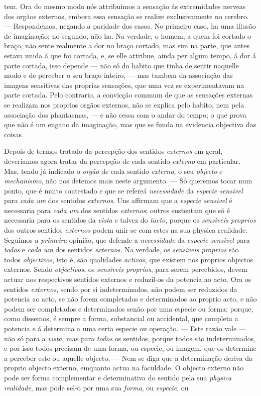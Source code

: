 tem. Ora do mesmo modo nós attribuimos a sensação ás extremidades nerveas dos orgãos externos, embora essa sensação se realize exclusivamente no cerebro. --- Respondemos, negando a paridade dos casos. No primeiro caso, ha uma illusão de imaginação; no segundo, não ha. Na verdade, o homem, a quem foi cortado o braço, não sente realmente a dor no braço cortado, mas sim na parte, que antes estava unida á que foi cortada, e, se elle attribue, ainda per algum tempo, á dor á parte cortada, isso depende --- não só do habito que tinha de sentir naquelle modo e de perceber o seu braço inteiro, --- mas tambem da associação das imagens sensitivas das proprias sensações, que uma vez se experimentavam na parte cortada. Pelo contrario, a convicção commum de que as sensações externas se realizam nos proprios orgãos externos, não se explica pelo habito, nem pela associação dos phantasmas, --- e não cessa com o andar do tempo; o que prova que não é um engano da imaginação, mas que se funda na evidencia objectiva das coisas.\par *\par Depois de termos tratado da percepção dos sentidos \emph{externos} em geral, deveriamos agora tratar da percepção de cada sentido \emph{externo} em particular. Mas, tendo já indicado o \emph{orgão} de cada sentido \emph{externo}, o seu \emph{objecto} e \emph{mechanismo}, não nos detemos mais neste argumento. --- Só queremos tocar num ponto, que é muito contestado e que se refereá \emph{necessidade} da \emph{especie sensivel} para \emph{cada um} dos sentidos \emph{externos}. Uns affirmam que a \emph{especie sensivel} é necessaria para \emph{cada um} dos sentidos \emph{externos}; outros sustentam que só é necessaria para os sentidos da \emph{vista} e talvez do \emph{tacto}, porque os \emph{sensiveis proprios} dos outros sentidos \emph{externos} podem unir-se com estes na sua physica realidade. Seguimos a \emph{primeira} opinião, que defende a \emph{necessidade} da \emph{especie sensivel} para \emph{todos} e \emph{cada um} dos sentidos \emph{externos}. Na verdade, os \emph{sensiveis proprios} são todos \emph{objectivos}, isto é, são qualidades \emph{activas}, que existem nos proprios objectos externos. Sendo \emph{objectivos}, os \emph{sensiveis proprios}, para serem percebidos, devem actuar nos respectivos sentidos externos e reduzil-os da potencia ao acto. Ora os sentidos \emph{externos}, sendo por si indeterminados, não podem ser reduzidos da potencia ao acto, se não forem completados e determinados ao proprio acto, e não podem ser completados e determinados senão por uma especie ou forma; porque, como dissemos, é sempre a forma, substancial ou accidental, que completa a potencia e á determina a uma certa especie ou operação. --- Este razão vale --- não só para a \emph{vista}, mas para \emph{todos} os sentidos, porque todos são indeterminados, e por isso todos precisam de uma forma, ou especie, ou imagem, que os determine a perceber este ou aquelle objecto. --- Nem se diga que a determinação deriva da proprio objecto externo, emquanto actua na faculdade. O objecto externo não pode ser forma complementar e determinativa do sentido pela sua \emph{physica realidade}, mas pode sel-o por uma sua \emph{forma}, ou \emph{especie}, ou 